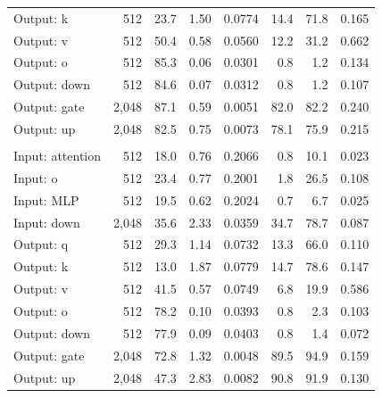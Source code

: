 \begin{table}[tbp]
\begin{tabularx}{\textwidth}{@{}>{\raggedright\arraybackslash}Xrrrrrrr@{}}
Output: k & 512 & 23.7 & 1.50 & 0.0774 & 14.4 & 71.8 & 0.165 \\
Output: v & 512 & 50.4 & 0.58 & 0.0560 & 12.2 & 31.2 & 0.662 \\
Output: o & 512 & 85.3 & 0.06 & 0.0301 & 0.8 & 1.2 & 0.134 \\
Output: down & 512 & 84.6 & 0.07 & 0.0312 & 0.8 & 1.2 & 0.107 \\
Output: gate & 2,048 & 87.1 & 0.59 & 0.0051 & 82.0 & 82.2 & 0.240 \\
Output: up & 2,048 & 82.5 & 0.75 & 0.0073 & 78.1 & 75.9 & 0.215 \\
\addlinespace[4pt]\multicolumn{8}{@{}l}{\textit{Muon2-ExpDiag}}\\
Input: attention & 512 & 18.0 & 0.76 & 0.2066 & 0.8 & 10.1 & 0.023 \\
Input: o & 512 & 23.4 & 0.77 & 0.2001 & 1.8 & 26.5 & 0.108 \\
Input: MLP & 512 & 19.5 & 0.62 & 0.2024 & 0.7 & 6.7 & 0.025 \\
Input: down & 2,048 & 35.6 & 2.33 & 0.0359 & 34.7 & 78.7 & 0.087 \\
Output: q & 512 & 29.3 & 1.14 & 0.0732 & 13.3 & 66.0 & 0.110 \\
Output: k & 512 & 13.0 & 1.87 & 0.0779 & 14.7 & 78.6 & 0.147 \\
Output: v & 512 & 41.5 & 0.57 & 0.0749 & 6.8 & 19.9 & 0.586 \\
Output: o & 512 & 78.2 & 0.10 & 0.0393 & 0.8 & 2.3 & 0.103 \\
Output: down & 512 & 77.9 & 0.09 & 0.0403 & 0.8 & 1.4 & 0.072 \\
Output: gate & 2,048 & 72.8 & 1.32 & 0.0048 & 89.5 & 94.9 & 0.159 \\
Output: up & 2,048 & 47.3 & 2.83 & 0.0082 & 90.8 & 91.9 & 0.130 \\
\bottomrule\end{tabularx}
\end{table}
